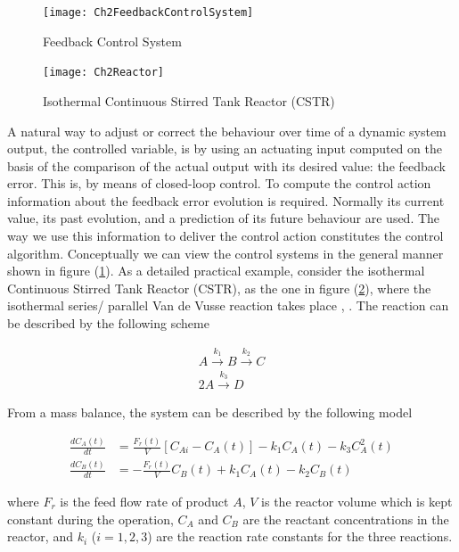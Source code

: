 \begin{figure}[tb]
\centering
\texttt{[image: Ch2FeedbackControlSystem]}
\caption{Feedback Control System} \label{Ch2fig:FeedbackControlSystem}
\end{figure}

\begin{figure}[tb]
\centering
\texttt{[image: Ch2Reactor]}
\caption{Isothermal Continuous Stirred Tank Reactor (CSTR)} 
\label{Ch2fig:CSTR}
\end{figure}

A natural way to adjust or correct the behaviour over time of a dynamic system output, the controlled variable, is by using an actuating input computed on the basis of the comparison of the actual output with its desired value: the feedback error. This is, by means of closed-loop control. To compute the control action information about the feedback error evolution is required. Normally its current value, its past evolution, and a prediction of its future behaviour are used. The way we use this information to deliver the control action constitutes the control algorithm. Conceptually we can view the control systems in the general manner shown in figure (\ref{Ch2fig:FeedbackControlSystem}). As a detailed  practical example, consider the isothermal Continuous Stirred Tank Reactor (CSTR), as the one in figure (\ref{Ch2fig:CSTR}), where the isothermal series/ parallel Van de Vusse reaction takes place \citep{arrietaETFA2008}, \citep{VandeVusse2} . The reaction can be described by the following scheme

\begin{align}
    A \overset{k_1}{\longrightarrow} B \overset{k_2}{\longrightarrow}C\\
    2 A \overset{k_3}{\longrightarrow} D \nonumber
\end{align}


From a mass balance, the system can be described by the following model

\begin{align}
    \frac{dC_A(t)}{dt} & = \frac{F_r(t)}{V} \left[C_{Ai}-C_A(t)\right] - k_1 C_A(t) - k_3 C^2_A(t) \nonumber \\
    \frac{dC_B(t)}{dt} & = -\frac{F_r(t)}{V} C_B(t)+ k_1 C_A(t) - k_2 C_B(t)
    \label{Ch2eq:system3}
\end{align}

\noindent where $F_r$ is the feed flow rate of product $A$, $V$ is the reactor volume which is kept constant during the operation, $C_A$ and $C_B$ are the reactant concentrations in the reactor, and $k_i$ ($i=1,2,3$) are the reaction rate constants for the three reactions.\\



